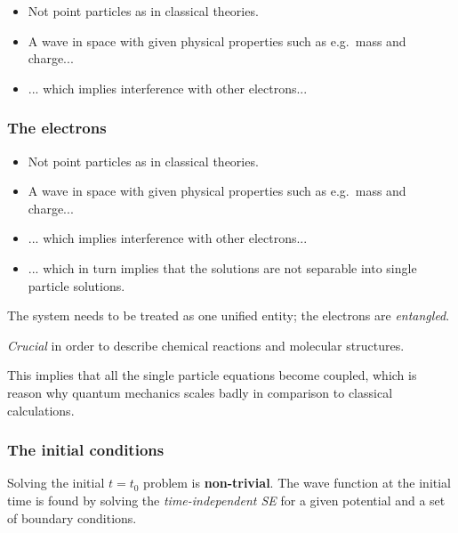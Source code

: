\documentclass[
paper=128mm:96mm, %
fontsize=11pt, %
pagesize, %
parskip=half-, %
]{scrartcl} %
\theoremstyle{mythmstyle} %
\begin{document}
\begin{itemize}
\item  Not point particles as in classical theories.
\item  A wave in space with given physical properties such as e.g.~mass and charge...
\item  ... which implies interference with other electrons...
\end{itemize}

\clearpage


\subsubsection*{The electrons}

\begin{itemize}
\item  Not point particles as in classical theories.
\item  A wave in space with given physical properties such as e.g.~mass and charge...
\item  ... which implies interference with other electrons...
\item  ... which in turn implies that the solutions are not separable into single particle solutions.
\end{itemize}

\clearpage


The system needs to be treated as one unified entity; the electrons are \textit{entangled}.

\vspace{0.5cm}

\textit{Crucial} in order to describe chemical reactions and molecular structures. 

\vspace{0.5cm}

This implies that all the single particle equations become coupled, which is reason why quantum mechanics scales badly in comparison to classical calculations.


\clearpage

\subsubsection*{The initial conditions}

Solving the initial $t=t_0$ problem is \textbf{non-trivial}. The wave function at the initial time is found by solving the \textit{time-independent SE} for a given potential and a set of boundary conditions.
\end{document}
